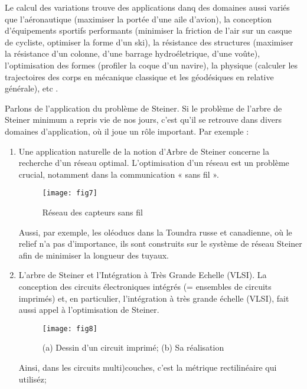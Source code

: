 \documentclass[10pt,a4paper]{article}%
\theoremstyle{theorem}
\theoremstyle{definition}
\begin{document}
	Le calcul des variations trouve des applications danq des domaines aussi variés que l'aéronautique (maximiser la portée d'une aile d'avion), la conception d'équipements sportifs performants (minimiser la friction de l'air sur un casque de cycliste, optimiser la forme d'un ski), la résistance des structures (maximiser la résistance d'un colonne, d'une barrage hydroéletrique, d'une voûte), l'optimisation des formes (profiler la coque d'un navire), la physique (calculer les trajectoires des corps en mécanique classique et les géodésiques en relative générale), etc \cite{Weinstock52}.
	
	
	Parlons de l'application du problème de Steiner. Si le problème de l’arbre de Steiner minimum a repris vie de nos	jours, c’est qu’il se retrouve dans divers domaines d’application, où il
	joue un rôle important. Par exemple :
	\begin{enumerate}
		\item Une application naturelle de la notion d’Arbre de Steiner concerne la recherche d’un
		réseau optimal. L’optimisation d’un réseau est un problème crucial, notamment dans la communication « sans fil ».
		\begin{figure}[h]
			\begin{center}
				\texttt{[image: fig7]}
			\end{center}
		\caption{Réseau des capteurs sans fil\cite{brazil}}
		\end{figure}
	
		Aussi, par exemple, les oléoducs dans la Toundra russe et canadienne, où le relief n'a pas d'importance, ils sont construits sur le système de réseau Steiner afin de minimiser la longueur des tuyaux.
		
		\item L’arbre de Steiner et l’Intégration à Très Grande Echelle (VLSI). La conception des circuits électroniques intégrés (= ensembles de circuits imprimés) et, en particulier, l’intégration à très grande échelle (VLSI), fait aussi appel à l’optimisation de Steiner.
		
		\begin{figure}[h]
			\begin{center}
				\texttt{[image: fig8]}
			\end{center}
		\caption{(a) Dessin d’un circuit imprimé; (b) Sa réalisation \cite{brazil}}
		\end{figure}
		 
		Ainsi, dans les circuits multi)couches, c'est la métrique rectilinéaire qui utiliséz;
		
		
	\end{enumerate}
\end{document}
